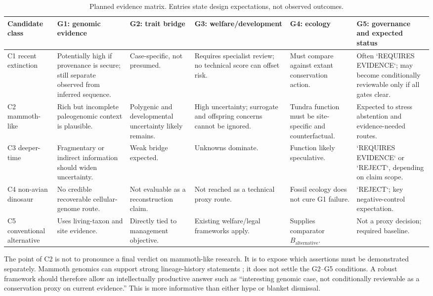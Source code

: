 \documentclass[conference]{IEEEtran}
\begin{document}
\begin{table}[t]
\caption{Planned evidence matrix. Entries state design expectations, not observed outcomes.}
\label{tab:matrix}
\centering
\footnotesize
\setlength{\tabcolsep}{2.0pt}
\begin{tabular}{p{} p{} p{} p{} p{} p{}}
\toprule
\textbf{Candidate class} & \textbf{G1: genomic evidence} & \textbf{G2: trait bridge} & \textbf{G3: welfare/development} & \textbf{G4: ecology} & \textbf{G5: governance and expected status} \\
\midrule
C1 recent extinction & Potentially high if provenance is secure; still separate observed from inferred sequence. & Case-specific, not presumed. & Requires specialist review; no technical score can offset risk. & Must compare against extant conservation action. & Often `REQUIRES EVIDENCE`; may become conditionally reviewable only if all gates clear. \\
C2 mammoth-like & Rich but incomplete paleogenomic context is plausible. & Polygenic and developmental uncertainty likely remains. & High uncertainty; surrogate and offspring concerns cannot be ignored. & Tundra function must be site-specific and counterfactual. & Expected to stress abstention and evidence-needed routes. \\
C3 deeper-time & Fragmentary or indirect information should widen uncertainty. & Weak bridge expected. & Unknowns dominate. & Function likely speculative. & `REQUIRES EVIDENCE` or `REJECT`, depending on claim scope. \\
C4 non-avian dinosaur & No credible recoverable cellular-genome route. & Not evaluable as a reconstruction claim. & Not reached as a technical proxy route. & Fossil ecology does not cure G1 failure. & `REJECT`; key negative-control expectation. \\
C5 conventional alternative & Uses living-taxon and site evidence. & Directly tied to management objective. & Existing welfare/legal frameworks apply. & Supplies comparator $B_{\mathrm{alternative}}$. & Not a proxy decision; required baseline. \\
\bottomrule
\end{tabular}
\end{table}

The point of C2 is not to pronounce a final verdict on mammoth-like research. It is to expose which assertions must be demonstrated separately. Mammoth genomics can support strong lineage-history statements \cite{vanderValk2021,palkopoulou2015,dehasque2024}; it does not settle the G2--G5 conditions. A robust framework should therefore allow an intellectually productive answer such as ``interesting genomic case, not conditionally reviewable as a conservation proxy on current evidence.'' This is more informative than either hype or blanket dismissal.
\end{document}
